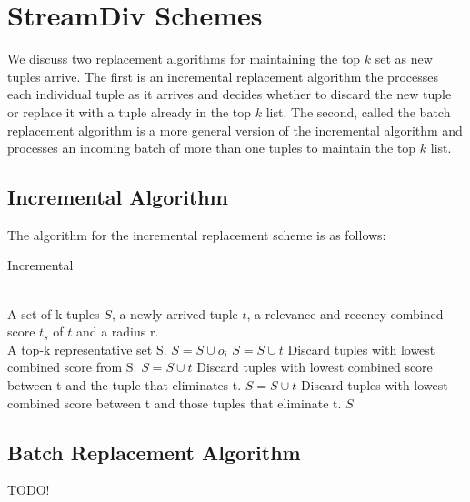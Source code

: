 \section{StreamDiv Schemes}
We discuss two replacement algorithms for maintaining the top $k$ set as new tuples arrive. The first is an incremental replacement algorithm the processes each individual tuple as it arrives and decides whether to discard the new tuple or replace it with a tuple already in the top $k$ list. The second, called the batch replacement algorithm is a more general version of the incremental algorithm and processes an incoming batch of more than one tuples to maintain the top $k$ list.

\subsection{Incremental Algorithm}
	The algorithm for the incremental replacement scheme is as follows:
	\begin{algorithm}
		\caption{Incremental }
		\label{alg:Incremental}
		\begin{algorithmic}[1]
			\REQUIRE ~~\\
			A set of k tuples $S$, a newly arrived tuple $t$, a relevance and recency combined score $t_s$ of $t$ and a radius r.
			\ENSURE ~~\\
			A top-k representative set S.
				\STATE $S = S \cup {o_i}$
			\ELSE
					\STATE $S = S \cup{t}$
					\STATE Discard tuples with lowest combined score from S.
				\ENDIF
					\STATE $S = S \cup{t}$
					\STATE Discard tuples with lowest combined score between t and the tuple that eliminates t.
				\ENDIF
					\STATE $S = S \cup{t}$
					\STATE Discard tuples with lowest combined score between t and those tuples that eliminate t.
				\ENDIF
			\ENDIF
			 $S$
		\end{algorithmic}
	\end{algorithm}

\subsection{Batch Replacement Algorithm}

TODO!